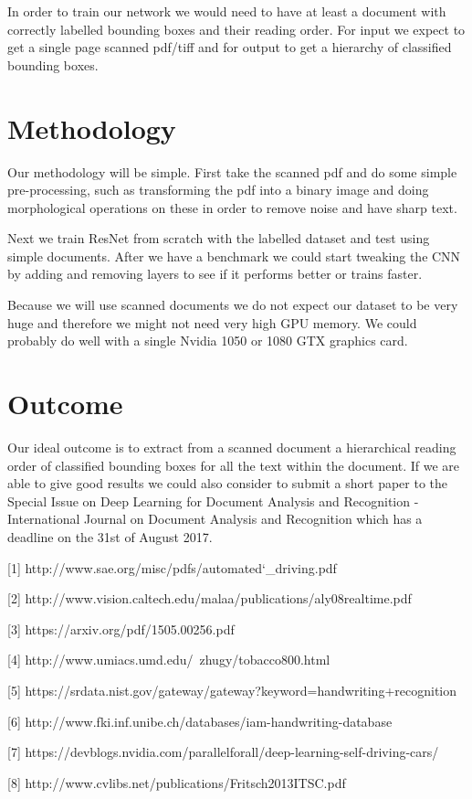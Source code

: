 \documentclass[10pt,twocolumn,letterpaper]{article}
\begin{document}
	In order to train our network we would need to have at least a document with correctly labelled bounding boxes and their reading order. For input we expect to get a single page scanned pdf/tiff and for output to get a hierarchy of classified bounding boxes.
	
	\section{Methodology}
	Our methodology will be simple. First take the scanned pdf and do some simple pre-processing, such as transforming the pdf into a binary image and doing morphological operations on these in order to remove noise and have sharp text.
	
	Next we train ResNet from scratch with the labelled dataset and test using simple documents. After we have a benchmark we could start tweaking the CNN by adding and removing layers to see if it performs better or trains faster.
	
	Because we will use scanned documents we do not expect our dataset to be very huge and therefore we might not need very high GPU memory. We could probably do well with a single Nvidia 1050 or 1080 GTX graphics card. 
	
	\section{Outcome}
	Our ideal outcome is to extract from a scanned document a hierarchical reading order of classified bounding boxes for all the text within the document. If we are able to give good results we could also consider to submit a short paper to the Special Issue on Deep Learning for Document Analysis and Recognition - International Journal on Document Analysis and Recognition which has a deadline on the 31st of August 2017.
	{\small
		
		
		
		[1] http://www.sae.org/misc/pdfs/automated\char`_driving.pdf
		
		[2] http://www.vision.caltech.edu/malaa/publications/aly08realtime.pdf
		
		[3] https://arxiv.org/pdf/1505.00256.pdf
		
		[4] http://www.umiacs.umd.edu/~zhugy/tobacco800.html
		
		[5] https://srdata.nist.gov/gateway/gateway?keyword=handwriting+recognition
		
		
		[6] http://www.fki.inf.unibe.ch/databases/iam-handwriting-database

		[7] https://devblogs.nvidia.com/parallelforall/deep-learning-self-driving-cars/		
		
		[8] http://www.cvlibs.net/publications/Fritsch2013ITSC.pdf
						
				
	}
	
\end{document}
